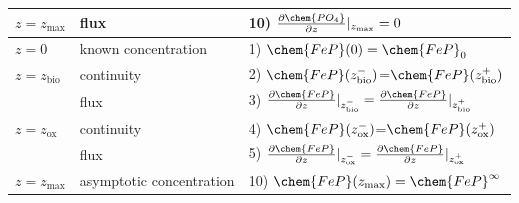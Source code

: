 \documentclass[gmd, manuscript]{copernicus}
\begin{document}
\begin{table}[tbp]
\begin{tabular}{ |l| l| l|}
$z=z_\mathrm{max}$& flux & 10) $\frac{\partial \chem{PO_4}}{\partial z}|_{z_\mathrm{max}}=0$\\
\hline
$z=0$& known concentration& 1) $\chem{FeP}(0)=\chem{FeP}_0$  \\
$z=z_{\mathrm{bio}}$&continuity& 2) $\chem{FeP}(z_{\mathrm{bio}}^-)$=$\chem{FeP}(z_{\mathrm{bio}}^+)$\\
  & flux & 3) $\frac{\partial \chem{FeP}}{\partial z}|_{z_{\mathrm{bio}}^-}=\frac{\partial \chem{FeP}}{\partial z}|_{z_{\mathrm{bio}}^+}$\\
$z=z_{\mathrm{ox}}$& continuity& 4) $\chem{FeP}(z_{\mathrm{ox}}^-)$=$\chem{FeP}(z_{\mathrm{ox}}^+)$\\
  & flux & 5) $\frac{\partial \chem{FeP}}{\partial z}|_{z_{\mathrm{ox}}^-} =\frac{\partial \chem{FeP}}{\partial z}|_{z_{\mathrm{ox}}^+}$\\
$z=z_\mathrm{max}$& asymptotic concentration & 10) $\chem{FeP}(z_\mathrm{max})=\chem{FeP}^\infty$\\
\hline    
\end{tabular}
\label{Tab:BC_PO4+M}
\end{table}
\end{document}
